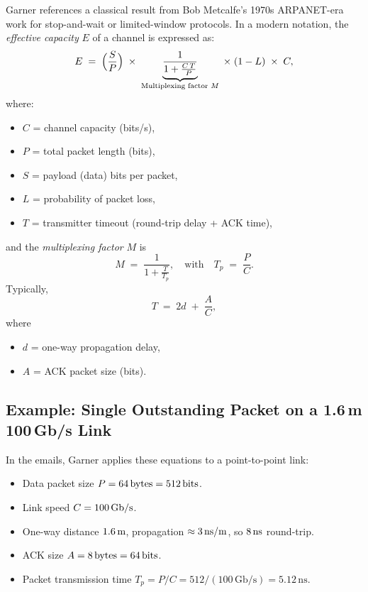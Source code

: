 \documentclass[../../../OAE-SPEC-MAIN.tex]{subfiles}
\begin{document}
Garner references a classical result from Bob Metcalfe’s 1970s ARPANET-era work for stop-and-wait or limited-window protocols. In a modern notation, the \emph{effective capacity} $E$ of a channel is expressed as:
\[
  E \;=\; 
  \Bigl(\frac{S}{P}\Bigr)\;
  \times\;\underbrace{\frac{1}{1 + \frac{C\,T}{P}}}_{\text{Multiplexing factor } M}
  \;\times\;(1 - L)\;\times\;C,
\]
where:
\begin{itemize}
\item $C$ = channel capacity (bits/s),
\item $P$ = total packet length (bits),
\item $S$ = payload (data) bits per packet,
\item $L$ = probability of packet loss,
\item $T$ = transmitter timeout (round-trip delay + ACK time),
\end{itemize}
and the \emph{multiplexing factor} $M$ is
\[
  M \;=\;
  \frac{1}{1 + \frac{T}{T_p}}, 
  \quad \text{with} \quad 
  T_p \;=\;\frac{P}{C}.
\]
Typically, 
\[
T \;=\; 2d \;+\; \frac{A}{C},
\]
where 
\begin{itemize}
\item $d$ = one-way propagation delay,
\item $A$ = ACK packet size (bits).
\end{itemize}


\subsection{Example: Single Outstanding Packet on a 1.6\,m 100\,Gb/s Link}

In the emails, Garner applies these equations to a point-to-point link:
\begin{itemize}
\item Data packet size $P = 64\text{\,bytes} = 512\text{\,bits}$.
\item Link speed $C = 100\text{\,Gb/s}$.
\item One-way distance $1.6\text{\,m}$, propagation $\approx 3\text{\,ns/m}$, so $8\text{\,ns}$ round-trip.
\item ACK size $A = 8\text{\,bytes} = 64\text{\,bits}$.
\item Packet transmission time $T_p = P/C = 512 / (100\,\text{Gb/s}) = 5.12\,\text{ns}$.
\end{itemize}
\end{document}
